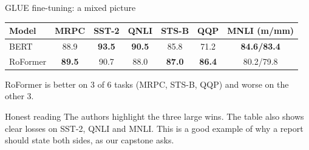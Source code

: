 \documentclass[aspectratio=169,11pt]{beamer}
\begin{document}
\begin{frame}{GLUE fine-tuning: a mixed picture}
  \centering
  \small
  \begin{tabular}{@{}lcccccc@{}}
    \toprule
    Model & MRPC & SST-2 & QNLI & STS-B & QQP & MNLI (m/mm)\\
    \midrule
    BERT & 88.9 & \textbf{93.5} & \textbf{90.5} & 85.8 & 71.2 & \textbf{84.6/83.4}\\
    RoFormer & \textbf{89.5} & 90.7 & 88.0 & \textbf{87.0} & \textbf{86.4} & 80.2/79.8\\
    \bottomrule
  \end{tabular}
  \vspace{3mm}

  \raggedright
  RoFormer is better on 3 of 6 tasks (MRPC, STS-B, QQP) and worse on the other 3.
  \vspace{2mm}

  \begin{exampleblock}{Honest reading}
    \small
    The authors highlight the three large wins. The table also shows clear losses on SST-2, QNLI and MNLI.
    This is a good example of why a report should state both sides, as our capstone asks.
  \end{exampleblock}
\end{frame}
\end{document}
